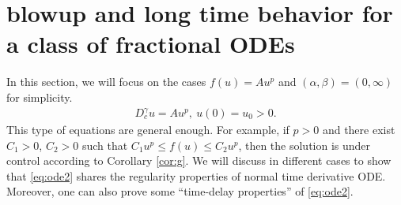 \documentclass[12pt]{amsart}%
\theoremstyle{definition}
\theoremstyle{remark}
\newtheorem{rmk}[thm]{Remark}
\renewcommand{\leq}{\leqslant}
\renewcommand{\geq}{\geqslant}
\renewcommand{\ge}{\geqslant}
\renewcommand{\le}{\leqslant}
\begin{document}


\section{blowup and long time behavior for a class of fractional ODEs} \label{sec:specialcase}

In this section, we will focus on the cases $f(u)=Au^p$ and $(\alpha, \beta)=(0, \infty)$ for simplicity.
\begin{gather}\label{eq:ode2}
D_c^{\gamma}u=Au^p,~ u(0)=u_0>0.
\end{gather}
This type of equations are general enough. For example, if $p>0$ and there exist $C_1>0$, $C_2 >0$ such that $C_1u^p\le f(u)\le C_2u^p$, then the solution is under control according to Corollary \ref{cor:g}. We will discuss in different cases to show that \eqref{eq:ode2} shares the regularity properties of normal time derivative ODE. Moreover, one can also prove some ``time-delay properties'' of \eqref{eq:ode2}.
\end{document}
